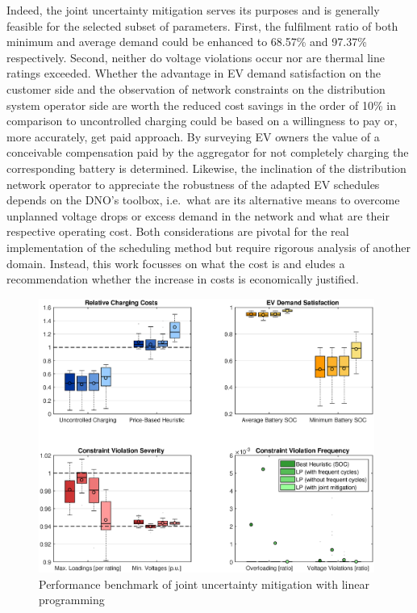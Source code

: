 Indeed, the joint uncertainty mitigation serves its purposes and is generally feasible for the selected subset of parameters. First, the fulfilment ratio of both minimum and average demand could be enhanced to 68.57\% and 97.37\% respectively. Second, neither do voltage violations occur nor are thermal line ratings exceeded. Whether the advantage in EV demand satisfaction on the customer side and the observation of network constraints on the distribution system operator side are worth the reduced cost savings in the order of 10\% in comparison to uncontrolled charging could be based on a willingness to pay or, more accurately, get paid approach. By surveying EV owners the value of a conceivable compensation paid by the aggregator for not completely charging the corresponding battery is determined. Likewise, the inclination of the distribution network operator to appreciate the robustness of the adapted EV schedules depends on the DNO's toolbox, i.e.\ what are its alternative means to overcome unplanned voltage drops or excess demand in the network and what are their respective operating cost. Both considerations are pivotal for the real implementation of the scheduling method but require rigorous analysis of another domain. Instead, this work focusses on what the cost is and eludes a recommendation whether the increase in costs is economically justified.

\begin{figure}[]
	\centering
	\includegraphics[width=0.98\textwidth,trim={2.9cm 1.7cm 2.5cm 0.9cm},clip]{figures/evaluation/joint.eps}
	\caption{Performance benchmark of joint uncertainty mitigation with linear programming}
	\label{fig:joint}
\end{figure}

